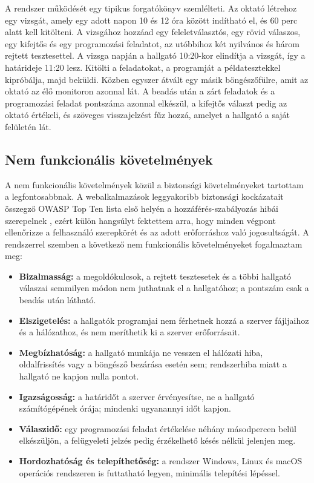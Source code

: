 A rendszer működését egy tipikus forgatókönyv szemlélteti. Az oktató létrehoz egy vizsgát, amely
egy adott napon 10 és 12 óra között indítható el, és 60 perc alatt kell kitölteni. A vizsgához
hozzáad egy feleletválasztós, egy rövid válaszos, egy kifejtős és egy programozási feladatot, az
utóbbihoz két nyilvános és három rejtett tesztesettel. A vizsga napján a hallgató 10:20-kor
elindítja a vizsgát, így a határideje 11:20 lesz. Kitölti a feladatokat, a programját a
példatesztekkel kipróbálja, majd beküldi. Közben egyszer átvált egy másik böngészőfülre, amit
az oktató az élő monitoron azonnal lát. A beadás után a zárt feladatok és a programozási
feladat pontszáma azonnal elkészül, a kifejtős választ pedig az oktató értékeli, és szöveges
visszajelzést fűz hozzá, amelyet a hallgató a saját felületén lát.

\subsection{Nem funkcionális követelmények}

A nem funkcionális követelmények közül a biztonsági követelményeket tartottam a
legfontosabbnak. A webalkalmazások leggyakoribb biztonsági kockázatait összegző OWASP Top Ten
lista első helyén a hozzáférés-szabályozás hibái szerepelnek \cite{owasp_top10}, ezért külön
hangsúlyt fektettem arra, hogy minden végpont ellenőrizze a felhasználó szerepkörét és az
adott erőforráshoz való jogosultságát. A rendszerrel szemben a következő nem funkcionális
követelményeket fogalmaztam meg:
\begin{itemize}
  \item \textbf{Bizalmasság:} a megoldókulcsok, a rejtett tesztesetek és a többi hallgató
  válaszai semmilyen módon nem juthatnak el a hallgatóhoz; a pontszám csak a beadás után
  látható.
  \item \textbf{Elszigetelés:} a hallgatók programjai nem férhetnek hozzá a szerver
  fájljaihoz és a hálózathoz, és nem meríthetik ki a szerver erőforrásait.
  \item \textbf{Megbízhatóság:} a hallgató munkája ne vesszen el hálózati hiba, oldalfrissítés
  vagy a böngésző bezárása esetén sem; rendszerhiba miatt a hallgató ne kapjon nulla pontot.
  \item \textbf{Igazságosság:} a határidőt a szerver érvényesítse, ne a hallgató számítógépének
  órája; mindenki ugyanannyi időt kapjon.
  \item \textbf{Válaszidő:} egy programozási feladat értékelése néhány másodpercen belül
  elkészüljön, a felügyeleti jelzés pedig érzékelhető késés nélkül jelenjen meg.
  \item \textbf{Hordozhatóság és telepíthetőség:} a rendszer Windows, Linux és macOS
  operációs rendszeren is futtatható legyen, minimális telepítési lépéssel.
\end{itemize}
